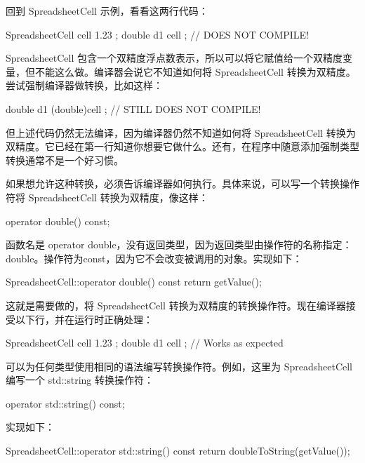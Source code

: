 
回到 SpreadsheetCell 示例，看看这两行代码：

\begin{cpp}
SpreadsheetCell cell { 1.23 };
double d1 { cell }; // DOES NOT COMPILE!
\end{cpp}

SpreadsheetCell 包含一个双精度浮点数表示，所以可以将它赋值给一个双精度变量，但不能这么做。编译器会说它不知道如何将 SpreadsheetCell 转换为双精度。尝试强制编译器做转换，比如这样：

\begin{cpp}
double d1 { (double)cell }; // STILL DOES NOT COMPILE!
\end{cpp}

但上述代码仍然无法编译，因为编译器仍然不知道如何将 SpreadsheetCell 转换为双精度。它已经在第一行知道你想要它做什么。还有，在程序中随意添加强制类型转换通常不是一个好习惯。

如果想允许这种转换，必须告诉编译器如何执行。具体来说，可以写一个转换操作符将 SpreadsheetCell 转换为双精度，像这样：

\begin{cpp}
operator double() const;
\end{cpp}

函数名是 operator double，没有返回类型，因为返回类型由操作符的名称指定：double。操作符为const，因为它不会改变被调用的对象。实现如下：

\begin{cpp}
SpreadsheetCell::operator double() const
{
    return getValue();
}
\end{cpp}

这就是需要做的，将 SpreadsheetCell 转换为双精度的转换操作符。现在编译器接受以下行，并在运行时正确处理：

\begin{cpp}
SpreadsheetCell cell { 1.23 };
double d1 { cell }; // Works as expected
\end{cpp}

可以为任何类型使用相同的语法编写转换操作符。例如，这里为 SpreadsheetCell 编写一个 std::string 转换操作符：

\begin{cpp}
operator std::string() const;
\end{cpp}

实现如下：

\begin{cpp}
SpreadsheetCell::operator std::string() const
{
    return doubleToString(getValue());
}
\end{cpp}

